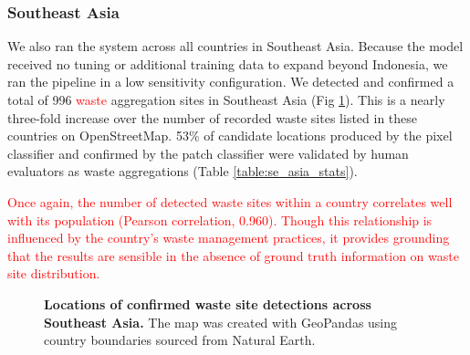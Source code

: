 \documentclass[10pt,letterpaper]{article}
\begin{document}
\subsubsection*{Southeast Asia}
We also ran the system across all countries in Southeast Asia. Because the model received no tuning or additional training data to expand beyond Indonesia, we ran the pipeline in a low sensitivity configuration. We detected and confirmed a total of 996 \textcolor{red}{waste} aggregation sites in Southeast Asia (Fig \ref{fig:se_asia_locations}). This is a nearly three-fold increase over the number of recorded waste sites listed in these countries on OpenStreetMap. 53\% of candidate locations produced by the pixel classifier and confirmed by the patch classifier were validated by human evaluators as waste aggregations (Table \ref{table:se_asia_stats}).

\textcolor{red}{Once again, the number of detected waste sites within a country correlates well with its population (Pearson correlation, 0.960). Though this relationship is influenced by the country's waste management practices, it provides grounding that the results are sensible in the absence of ground truth information on waste site distribution.}

\begin{figure}[!h]
    \caption{{\bf Locations of confirmed waste site detections across Southeast Asia.}
    The map was created with GeoPandas \cite{kelsey_jordahl_2020_3946761} using country boundaries sourced from Natural Earth.}
    \label{fig:se_asia_locations}
\end{figure}
\end{document}
